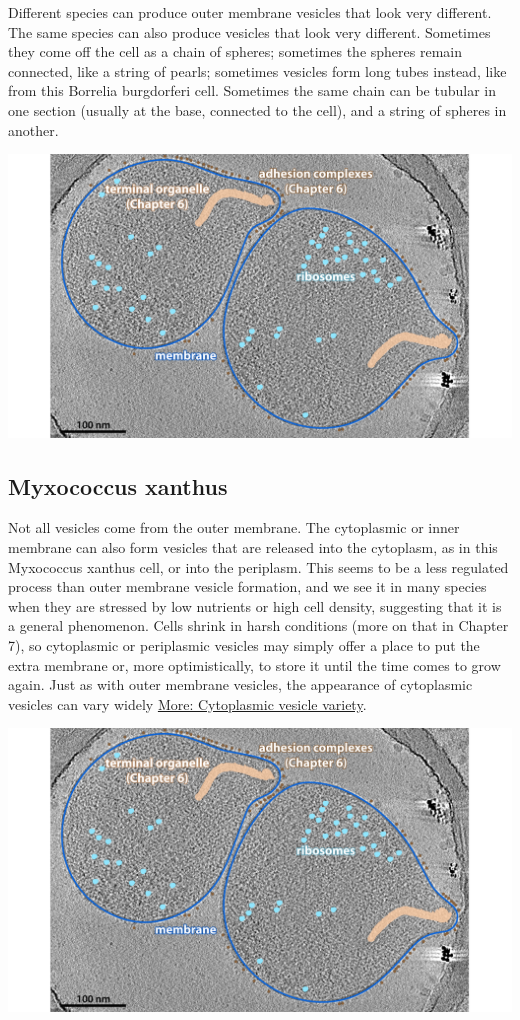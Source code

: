 \documentclass[]{tufte-book}
\begin{document}
Different species can produce outer membrane vesicles that look very
different. The same species can also produce vesicles that look very
different. Sometimes they come off the cell as a chain of spheres;
sometimes the spheres remain connected, like a string of pearls;
sometimes vesicles form long tubes instead, like from this Borrelia
burgdorferi cell. Sometimes the same chain can be tubular in one section
(usually at the base, connected to the cell), and a string of spheres in
another.

\includegraphics{img/02_static/2_1_Mgenitalium}

\subsection{Myxococcus xanthus}\label{Inner_membrane_vesicles}

Not all vesicles come from the outer membrane. The cytoplasmic or inner
membrane can also form vesicles that are released into the cytoplasm, as
in this Myxococcus xanthus cell, or into the periplasm. This seems to be
a less regulated process than outer membrane vesicle formation, and we
see it in many species when they are stressed by low nutrients or high
cell density, suggesting that it is a general phenomenon. Cells shrink
in harsh conditions (more on that in Chapter 7), so cytoplasmic or
periplasmic vesicles may simply offer a place to put the extra membrane
or, more optimistically, to store it until the time comes to grow again.
Just as with outer membrane vesicles, the appearance of cytoplasmic
vesicles can vary widely
\protect\hyperlink{Cytoplasmic_vesicle_variety}{More: Cytoplasmic
vesicle variety}.

\includegraphics{img/02_static/2_1_Mgenitalium}
\end{document}
